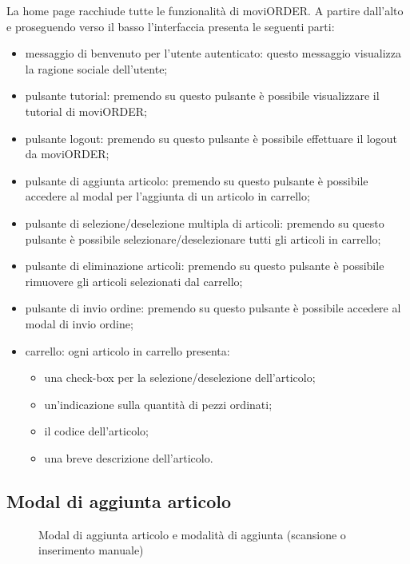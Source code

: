 La home page racchiude tutte le funzionalità di moviORDER. A partire dall'alto e proseguendo verso il basso l'interfaccia presenta le seguenti parti:
\begin{itemize}
	\item messaggio di benvenuto per l'utente autenticato: questo messaggio visualizza la ragione sociale dell'utente;
	\item pulsante tutorial: premendo su questo pulsante è possibile visualizzare il tutorial di moviORDER;
	\item pulsante logout: premendo su questo pulsante è possibile effettuare il logout da moviORDER;
	\item pulsante di aggiunta articolo: premendo su questo pulsante è possibile accedere al modal per l'aggiunta di un articolo in carrello; 
	\item pulsante di selezione/deselezione multipla di articoli: premendo su questo pulsante è possibile selezionare/deselezionare tutti gli articoli in carrello;
	\item pulsante di eliminazione articoli: premendo su questo pulsante è possibile rimuovere gli articoli selezionati dal carrello;
	\item pulsante di invio ordine: premendo su questo pulsante è possibile accedere al modal di invio ordine;
	\item carrello: ogni articolo in carrello presenta:
	\begin{itemize}
		\item una check-box per la selezione/deselezione dell'articolo;
		\item un'indicazione sulla quantità di pezzi ordinati;
		\item il codice dell'articolo;
		\item una breve descrizione dell'articolo.
	\end{itemize}
\end{itemize}

\subsection{Modal di aggiunta articolo}

\begin{figure}[!h] 
    \centering 
    \caption{Modal di aggiunta articolo e modalità di aggiunta (scansione o inserimento manuale)}
\end{figure}

